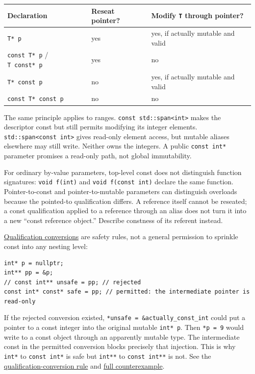 {\def\LTcaptype{none} %
\begin{longtable}[]{@{}lll@{}}
\toprule\noalign{}
Declaration & Reseat pointer? & Modify \texttt{T} through pointer? \\
\midrule\noalign{}
\endhead
\bottomrule\noalign{}
\endlastfoot
\texttt{T*\ p} & yes & yes, if actually mutable and valid \\
\texttt{const\ T*\ p} / \texttt{T\ const*\ p} & yes & no \\
\texttt{T*\ const\ p} & no & yes, if actually mutable and valid \\
\texttt{const\ T*\ const\ p} & no & no \\
\end{longtable}
}

The same principle applies to ranges. \texttt{const\ std::span\textless{}int\textgreater{}} makes the descriptor const but still permits modifying its integer elements. \texttt{std::span\textless{}const\ int\textgreater{}} gives read-only element access, but mutable aliases elsewhere may still write. Neither owns the integers. A public \texttt{const\ int*} parameter promises a read-only path, not global immutability.

For ordinary by-value parameters, top-level const does not distinguish function signatures: \texttt{void\ f(int)} and \texttt{void\ f(const\ int)} declare the same function. Pointer-to-const and pointer-to-mutable parameters can distinguish overloads because the pointed-to qualification differs. A reference itself cannot be reseated; a const qualification applied to a reference through an alias does not turn it into a new ``const reference object.'' Describe constness of its referent instead.

\hyperref[appendix-5e1a7561cd98]{Qualification conversions} are safety rules, not a general permission to sprinkle const into any nesting level:

\begin{verbatim}
int* p = nullptr;
int** pp = &p;
// const int** unsafe = pp; // rejected
const int* const* safe = pp; // permitted: the intermediate pointer is read-only
\end{verbatim}

If the rejected conversion existed, \texttt{*unsafe\ =\ \&actually\_const\_int} could put a pointer to a const integer into the original mutable \texttt{int*\ p}. Then \texttt{*p\ =\ 9} would write to a const object through an apparently mutable type. The intermediate const in the permitted conversion blocks precisely that injection. This is why \texttt{int*} to \texttt{const\ int*} is safe but \texttt{int**} to \texttt{const\ int**} is not. See the \href{https://eel.is/c++draft/conv.qual}{qualification-conversion rule} and \hyperref[01-foundations-i-ch011-c---qualification-safety-and-borrow-intervals]{full counterexample}.

